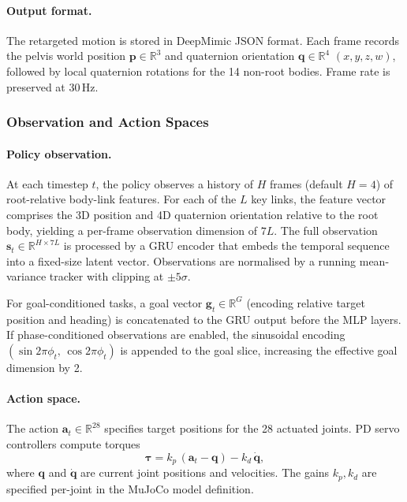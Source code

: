 \paragraph{Output format.}
The retargeted motion is stored in DeepMimic JSON format. Each frame records the pelvis world position $\mathbf{p} \in \mathbb{R}^3$ and quaternion orientation $\mathbf{q} \in \mathbb{R}^4$ $(x,y,z,w)$, followed by local quaternion rotations for the 14 non-root bodies. Frame rate is preserved at 30\,Hz.


\subsubsection{Observation and Action Spaces}
\label{sec:obs_action}

\paragraph{Policy observation.}
At each timestep $t$, the policy observes a history of $H$ frames (default $H{=}4$) of root-relative body-link features. For each of the $L$ key links, the feature vector comprises the 3D position and 4D quaternion orientation relative to the root body, yielding a per-frame observation dimension of $7L$. The full observation $\mathbf{s}_t \in \mathbb{R}^{H \times 7L}$ is processed by a GRU encoder that embeds the temporal sequence into a fixed-size latent vector. Observations are normalised by a running mean-variance tracker with clipping at $\pm 5\sigma$.

For goal-conditioned tasks, a goal vector $\mathbf{g}_t \in \mathbb{R}^{G}$ (encoding relative target position and heading) is concatenated to the GRU output before the MLP layers. If phase-conditioned observations are enabled, the sinusoidal encoding $(\sin 2\pi\phi_t,\, \cos 2\pi\phi_t)$ is appended to the goal slice, increasing the effective goal dimension by 2.

\paragraph{Action space.}
The action $\mathbf{a}_t \in \mathbb{R}^{28}$ specifies target positions for the 28 actuated joints. PD servo controllers compute torques
\[
    \boldsymbol{\tau} = k_p\,(\mathbf{a}_t - \mathbf{q}) - k_d\,\dot{\mathbf{q}},
\]
where $\mathbf{q}$ and $\dot{\mathbf{q}}$ are current joint positions and velocities. The gains $k_p, k_d$ are specified per-joint in the MuJoCo model definition.

